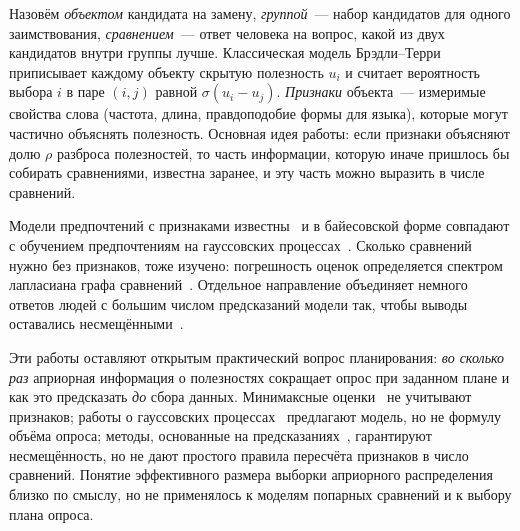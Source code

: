 \documentclass{article}
\theoremstyle{definition}
\theoremstyle{remark}
\begin{document}
Назовём \emph{объектом} кандидата на замену, \emph{группой}~--- набор кандидатов для одного заимствования, \emph{сравнением}~--- ответ человека на вопрос, какой из двух кандидатов внутри группы лучше. Классическая модель Брэдли--Терри~\citep{bradley1952rank} приписывает каждому объекту скрытую полезность $u_i$ и считает вероятность выбора $i$ в паре $(i,j)$ равной $\sigma(u_i-u_j)$. \emph{Признаки} объекта~--- измеримые свойства слова (частота, длина, правдоподобие формы для языка), которые могут частично объяснять полезность. Основная идея работы: если признаки объясняют долю $\rho$ разброса полезностей, то часть информации, которую иначе пришлось бы собирать сравнениями, известна заранее, и эту часть можно выразить в числе сравнений.

Модели предпочтений с признаками известны~\citep{turner2012bradleyterry2} и в байесовской форме совпадают с обучением предпочтениям на гауссовских процессах~\citep{chu2005preference}. Сколько сравнений нужно без признаков, тоже изучено: погрешность оценок определяется спектром лапласиана графа сравнений~\citep{shah2016estimation}. Отдельное направление объединяет немного ответов людей с большим числом предсказаний модели так, чтобы выводы оставались несмещёнными~\citep{angelopoulos2023prediction, chatzi2024prediction}.

Эти работы оставляют открытым практический вопрос планирования: \emph{во сколько раз} априорная информация о полезностях сокращает опрос при заданном плане и как это предсказать \emph{до} сбора данных. Минимаксные оценки~\citep{shah2016estimation} не учитывают признаков; работы о гауссовских процессах~\citep{chu2005preference} предлагают модель, но не формулу объёма опроса; методы, основанные на предсказаниях~\citep{angelopoulos2023prediction}, гарантируют несмещённость, но не дают простого правила пересчёта признаков в число сравнений. Понятие эффективного размера выборки априорного распределения~\citep{morita2008determining} близко по смыслу, но не применялось к моделям попарных сравнений и к выбору плана опроса.
\end{document}
